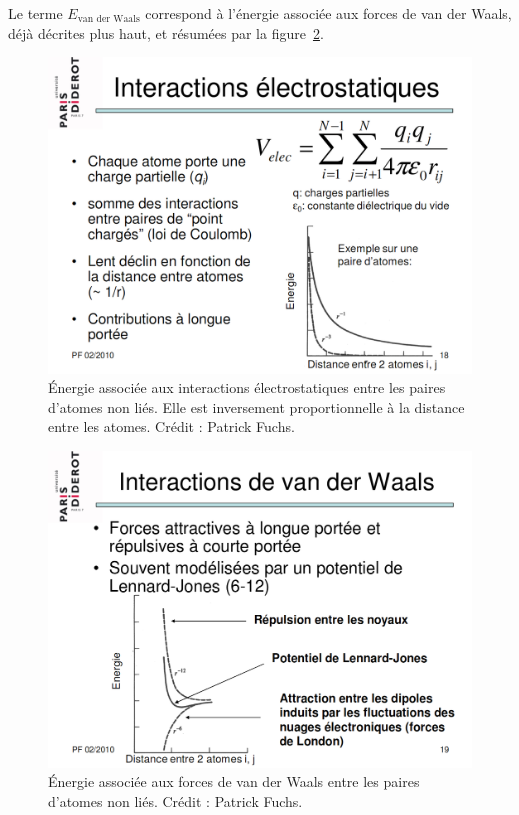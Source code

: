 	Le terme $E_\text{van der Waals}$ correspond à l'énergie associée aux forces de van der Waals, déjà décrites plus haut, et résumées par la figure~\ref{fig:e_vdw}.
	
	\begin{figure}[H]
		\centering
		\includegraphics[width=\textwidth]{figures/ch1/e_electrostat}
		\caption[Énergie liée aux interactions électrostatiques.]{Énergie associée aux interactions électrostatiques entre les paires d'atomes non liés. Elle est inversement proportionnelle à la distance entre les atomes. Crédit : Patrick Fuchs\footnotemark.}
		\label{fig:e_electrostat}
	\end{figure}
	
	\begin{figure}[H]
		\centering
		\includegraphics[width=\textwidth]{figures/ch1/e_vdw}
		\caption[Énergie liée aux forces de van der Waals.]{Énergie associée aux forces de van der Waals entre les paires d'atomes non liés. Crédit : Patrick Fuchs\footnotemark.}
		\label{fig:e_vdw}
	\end{figure}
	
